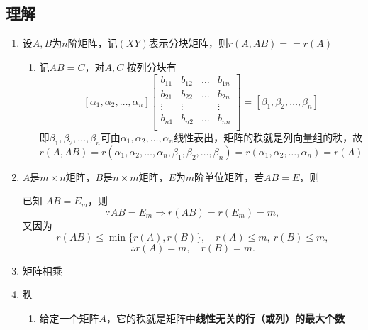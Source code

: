 \documentclass[a4paper,12pt]{article}
\begin{document}
    \subsection{理解}

    \begin{enumerate}
        \item 设$A, B$为$n$阶矩阵，记$(X Y)$表示分块矩阵，则$r(A, AB) == r(A)$
        \begin{enumerate}
            \item 记$AB = C$，对$A, C$ 按列分块有
            \[
                [\alpha_1, \alpha_2, \dots, \alpha_n]
                \begin{bmatrix}
                    b_{11} & b_{12} & \dots & b_{1n} \\
                    b_{21} & b_{22} & \dots & b_{2n} \\
                    \vdots & \vdots &       & \vdots \\
                    b_{n1} & b_{n2} & \dots & b_{nn} \\
                \end{bmatrix}
                = [\beta_1, \beta_2, \dots, \beta_n]
            \]
            即$\beta_1, \beta_2, \dots, \beta_n$可由$\alpha_1, \alpha_2, \dots, \alpha_n$线性表出，矩阵的秩就是列向量组的秩，故
            \[
                r(A, AB) = r(\alpha_1, \alpha_2, \dots, \alpha_n, \beta_1, \beta_2, \dots, \beta_n) = r(\alpha_1, \alpha_2, \dots, \alpha_n) = r(A)
            \]
        \end{enumerate}
        \item $A$是$m \times n$矩阵，$B$是$n \times m$矩阵，$E$为$m$阶单位矩阵，若$AB = E$，则{\color[rgb]{0.2, 0.6, 0.3}{$r(A) = m, r(B) = m$}}
        \begin{analysisbox}
            已知 $AB = E_m$，则
            \[
                \because AB = E_m \Rightarrow r(AB) = r(E_m) = m,
            \]
            又因为
            \[
                r(AB) \le \min\{r(A), r(B)\}, \quad r(A)\le m, \ r(B)\le m,
            \]
            \[
                \therefore r(A)=m,\quad r(B)=m.
            \]
        \end{analysisbox}
        \item 矩阵相乘 \Leftrightarrow {}
        \item 秩
        \begin{enumerate}
            \item 给定一个矩阵$A$，它的秩就是矩阵中\textbf{线性无关的行（或列）的最大个数}

\end{enumerate}
\end{enumerate}
\end{document}
